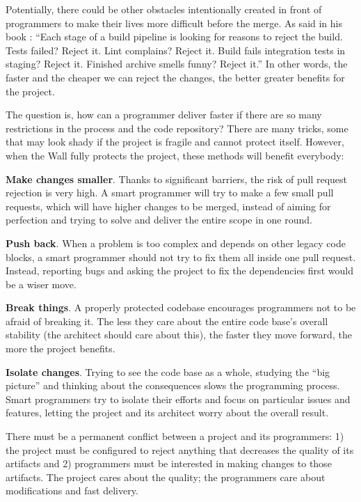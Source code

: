 \documentclass{main}
\begin{document}
Potentially, there could be other obstacles intentionally created
in front of programmers to make their lives more difficult
before the merge. As \textcite{nygard18} said in his book :
``Each stage of a build pipeline is looking for reasons to reject the build. Tests
failed? Reject it. Lint complains? Reject it. Build fails integration
tests in staging? Reject it. Finished archive smells funny? Reject it.''
In other words, the faster and the cheaper we can reject the changes,
the better greater benefits for the project.

The question is, how can a programmer deliver faster if there are so many restrictions in the
process and the code repository? There are many tricks, some that may look
shady if the project is fragile and cannot protect itself. However, when the Wall fully protects the project, these methods will benefit everybody:

\textbf{Make changes smaller}. Thanks to significant barriers, the risk of pull
  request rejection is very high. A smart programmer will try to make a few small
  pull requests, which will have higher changes to be merged, instead of aiming
  for perfection and trying to solve and deliver the entire scope in one round.

\textbf{Push back}. When a problem is too complex and depends on other legacy code
  blocks, a smart programmer should not try to fix them all inside one pull
  request. Instead, reporting bugs and asking the project to fix the
  dependencies first would be a wiser move.

\textbf{Break things}. A properly protected codebase encourages programmers not to be
  afraid of breaking it. The less they care about the entire code base's overall
  stability (the architect should care about this), the faster they move forward,
  the more the project benefits.

\textbf{Isolate changes}. Trying to see the code base as a whole, studying the ``big
  picture'' and thinking about the consequences slows the programming
  process. Smart programmers try to isolate their efforts and focus on
  particular issues and features, letting the project and its architect worry
  about the overall result.

There must be a permanent conflict between a project and its
programmers: 1) the project must be configured to reject anything that decreases the quality of
its artifacts and 2) programmers must be interested in making changes to
those artifacts. The project cares about the quality; the programmers care about
modifications and fast delivery.
\end{document}
